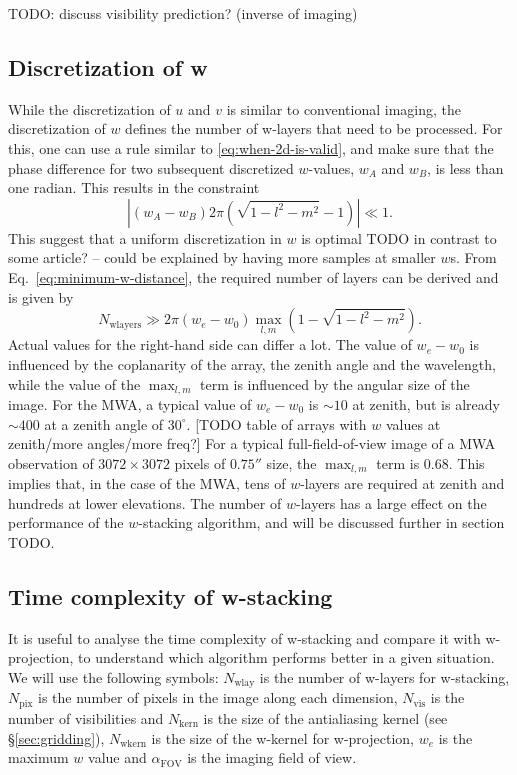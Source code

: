 \documentclass[useAMS,usenatbib]{mn2e}
\begin{document}
TODO: discuss visibility prediction? (inverse of imaging)

\subsection{Discretization of w} \label{sec:gridding-w}
While the discretization of $u$ and $v$ is similar to conventional imaging, the discretization of $w$ defines the number of w-layers that need to be processed. For this, one can use a rule similar to \eqref{eq:when-2d-is-valid}, and make sure that the phase difference for two subsequent discretized $w$-values, $w_A$ and $w_B$,  is less than one radian. This results in the constraint
\begin{equation} \label{eq:minimum-w-distance}
\left|\left(w_A - w_B\right) 2\pi (\sqrt{1-l^2-m^2}-1)\right| \ll 1.
\end{equation}
This suggest that a uniform discretization in $w$ is optimal TODO in contrast to some article? -- could be explained by having more samples at smaller $w$s. From Eq.~\eqref{eq:minimum-w-distance}, the required number of layers can be derived and is given by
\begin{equation} \label{eq:nwlayers-bound}
 N_\textrm{wlayers} \gg 2\pi \left(w_e - w_0\right) \max_{l,m} \left(1 - \sqrt{1-l^2-m^2}\right).
\end{equation}
Actual values for the right-hand side can differ a lot. The value of $w_e - w_0$ is influenced by the coplanarity of the array, the zenith angle and the wavelength, while the value of the $\max_{l,m}$ term is influenced by the angular size of the image. For the MWA, a typical value of $w_e - w_0$ is $\sim 10$ at zenith, but is already $\sim 400$ at a zenith angle of $30^{\circ}$. [TODO table of arrays with $w$ values at zenith/more angles/more freq?] For a typical full-field-of-view image of a MWA observation of $3072\times 3072$ pixels of $0.75''$ size, the $\max_{l,m}$ term is $0.68$. This implies that, in the case of the MWA, tens of $w$-layers are required at zenith and hundreds at lower elevations. The number of $w$-layers has a large effect on the performance of the $w$-stacking algorithm, and will be discussed further in section TODO.

\subsection{Time complexity of w-stacking}
It is useful to analyse the time complexity of w-stacking and compare it with w-projection, to understand which algorithm performs better in a given situation. We will use the following symbols: $N_\textrm{wlay}$ is the number of w-layers for w-stacking, $N_\textrm{pix}$ is the number of pixels in the image along each dimension, $N_\textrm{vis}$ is the number of visibilities and $N_\textrm{kern}$ is the size of the antialiasing kernel (see \S\ref{sec:gridding}), $N_\textrm{wkern}$ is the size of the w-kernel for w-projection, $w_e$ is the maximum $w$ value and $\alpha_\textrm{FOV}$ is the imaging field of view.
\end{document}
